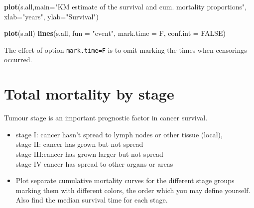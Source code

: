 \documentclass[
]{book}
\newenvironment{Shaded}{\begin{snugshade}}{\end{snugshade}}
\newcommand{\AttributeTok}[1]{\textcolor[rgb]{0.13,0.29,0.53}{#1}}
\newcommand{\ConstantTok}[1]{\textcolor[rgb]{0.56,0.35,0.01}{#1}}
\newcommand{\FunctionTok}[1]{\textcolor[rgb]{0.13,0.29,0.53}{\textbf{#1}}}
\newcommand{\NormalTok}[1]{#1}
\newcommand{\StringTok}[1]{\textcolor[rgb]{0.31,0.60,0.02}{#1}}
\begin{document}
\begin{Shaded}
\begin{Highlighting}[]
\FunctionTok{plot}\NormalTok{(s.all,}\AttributeTok{main=}\StringTok{"KM estimate of the survival}
\StringTok{     and cum. mortality proportions"}\NormalTok{,}
     \AttributeTok{xlab=}\StringTok{"years"}\NormalTok{, }\AttributeTok{ylab=}\StringTok{"Survival"}\NormalTok{)}
\end{Highlighting}
\end{Shaded}

\begin{Shaded}
\begin{Highlighting}[]
\FunctionTok{plot}\NormalTok{(s.all)}
\FunctionTok{lines}\NormalTok{(s.all, }\AttributeTok{fun =} \StringTok{"event"}\NormalTok{, }\AttributeTok{mark.time =}\NormalTok{ F, }\AttributeTok{conf.int =} \ConstantTok{FALSE}\NormalTok{)}
\end{Highlighting}
\end{Shaded}

The effect of option \texttt{mark.time=F} is to omit marking the times when
censorings occurred.

\section{Total mortality by stage}\label{total-mortality-by-stage}

Tumour stage is an important prognostic factor in cancer survival.

\begin{itemize}
\item
  stage I: cancer hasn't spread to lymph nodes or other tissue (local),\\
  stage II: cancer has grown but not spread\\
  stage III:cancer has grown larger but not spread\\
  stage IV cancer has spread to other organs or areas
\item
  Plot separate cumulative mortality curves for the different stage
  groups marking them with different colors, the order which you may
  define yourself. Also find the median survival time for each stage.
\end{itemize}
\end{document}
